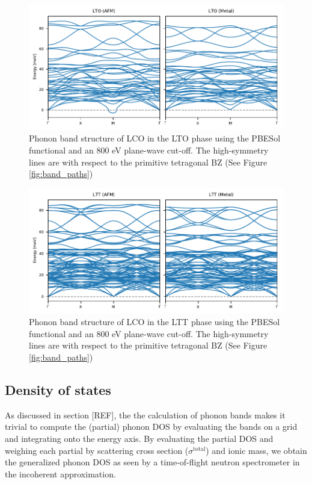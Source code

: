 \begin{figure}
	\centering
	\includegraphics[width=\textwidth]{fig/simulation/lto_bands.pdf}
	\caption[LTO Bands]{Phonon band structure of LCO in the LTO phase using the PBESol functional and an 800 eV plane-wave cut-off. The high-symmetry lines are with respect to the primitive tetragonal BZ (See Figure \ref{fig:band_paths})}
	\label{fig:lto_bands}
\end{figure}

\begin{figure}
	\centering
	\includegraphics[width=\textwidth]{fig/simulation/ltt_bands.pdf}
	\caption[LTT Bands]{Phonon band structure of LCO in the LTT phase using the PBESol functional and an 800 eV plane-wave cut-off. The high-symmetry lines are with respect to the primitive tetragonal BZ (See Figure \ref{fig:band_paths})}
	\label{fig:ltt_bands}
\end{figure}

\subsection{Density of states}
As discussed in section [REF], the the calculation of phonon bands makes it trivial to compute the (partial) phonon DOS by evaluating the bands on a grid and integrating onto the energy axis. By evaluating the partial DOS and weighing each partial by scattering cross section ($\sigma^\text{total}$) and ionic mass, we obtain the generalized phonon DOS as seen by a time-of-flight neutron spectrometer in the incoherent approximation. 

